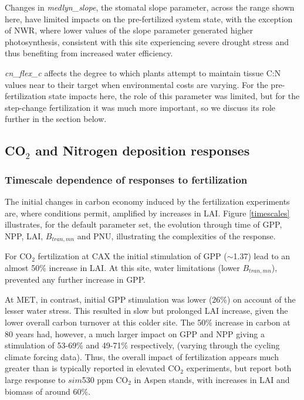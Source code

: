 \documentclass[draft,linenumbers]{agujournal}
\begin{document}
Changes in \emph{medlyn\_slope}, the stomatal slope parameter, across the range shown here, have limited impacts on the pre-fertilized system state, with the exception of NWR, where lower values of the slope parameter generated higher photosynthesis, consistent with this site experiencing severe drought stress and thus benefiting from increased water efficiency. 

\emph{cn\_flex\_c} affects the degree to which plants attempt to maintain tissue C:N values near to their target when environmental costs are varying. For the pre-fertilization state impacts here, the role of this parameter was limited, but for the step-change fertilization it was much more important, so we discuss its role further in the section below. 

\subsection{CO$_{2}$ and Nitrogen deposition responses}

\subsubsection{Timescale dependence of responses to fertilization}
The initial changes in carbon economy induced by the fertilization experiments are, where conditions permit, amplified by increases in LAI. Figure \ref{timescales} illustrates, for the default parameter set, the evolution through time of GPP, NPP, LAI, $B_{tran,mn}$ and PNU, illustrating the complexities of the response. 

For CO$_{2}$ fertilization at CAX the initial stimulation of GPP ($\sim$1.37) lead to an almost 50\% increase in LAI. At this site, water limitations (lower $B_{tran,mn}$), prevented any further increase in GPP. 

 At MET, in contrast, initial GPP stimulation was lower (26\%) on account of the lesser water stress. This resulted in slow but prolonged LAI increase, given the lower overall carbon turnover at this colder site. The 50\% increase in carbon at 80 years had, however, a much larger impact on GPP and NPP giving a stimulation of 53-69\% and 49-71\% respectively, (varying through the cycling climate forcing data). Thus, the overall impact of fertilization appears much greater than is typically reported in elevated CO$_{2}$ experiments, but \cite{king2005} report both large response to $sim$530 ppm CO$_{2}$ in Aspen stands, with increases in LAI and biomass of around 60\%.
 
\end{document}
